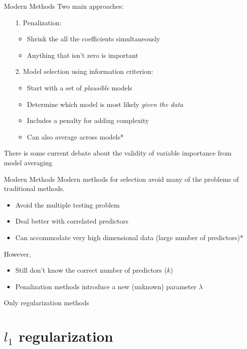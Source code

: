 \documentclass{beamer}\usepackage[]{graphicx}\usepackage[]{color}
\begin{document}
\begin{frame}{Modern Methods}
Two main approaches:
\bigskip
\begin{itemize}
\item[1.] Penalization:
  \begin{itemize}
  \item Shrink the all the coefficients simultaneously
  \item Anything that isn't zero is important
  \end{itemize}
\pause
\bigskip

\item[2.] Model selection using information criterion:
  \begin{itemize}
  \item Start with a set of \emph{plausible} models
  \item Determine which model is most likely \emph{given the data}
  \item Includes a penalty for adding complexity
  \item Can also average across models*
  \end{itemize}
\end{itemize}
\pause

\bigskip
{\small*There is some current debate about the validity of variable importance from model averaging}
\end{frame}

\begin{frame}{Modern Methods}
Modern methods for selection avoid many of the problems of traditional methods.
\bigskip
  \begin{itemize}
  \item Avoid the multiple testing problem
  \item Deal better with correlated predictors
  \item Can accommodate very high dimensional data (large number of predictors)*
  \end{itemize}
\bigskip
\pause
However, 
\smallskip
\begin{itemize}
  \item Still don't know the correct number of predictors ($k$)
  \item Penalization methods introduce a new (unknown) parameter $\lambda$ 
\end{itemize}

\bigskip
{\small *Only regularization methods}
\end{frame}

\section{$l_1$ regularization}
\end{document}
